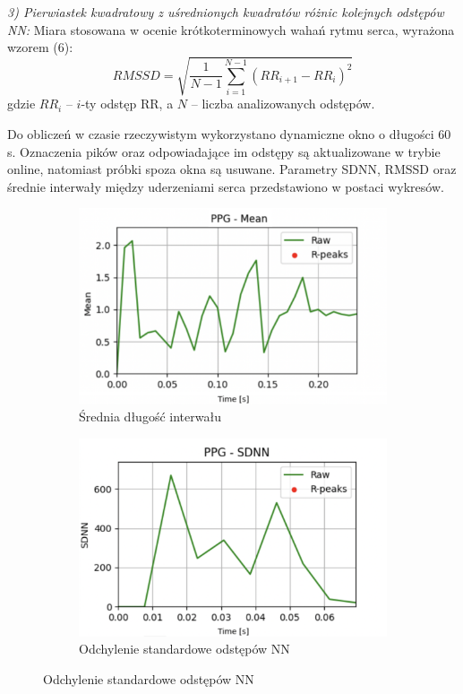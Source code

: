 \documentclass[journal]{IEEEtran}
\begin{document}
\noindent\textit{3) Pierwiastek kwadratowy z uśrednionych kwadratów różnic kolejnych odstępów NN:} 
Miara stosowana w ocenie krótkoterminowych wahań rytmu serca, wyrażona wzorem (6):
\begin{equation}
    RMSSD = \sqrt{\frac{1}{N-1} \sum_{i=1}^{N-1} (RR_{i+1} - RR_i)^2}
\end{equation}
gdzie $RR_i$ -- $i$-ty odstęp RR, a $N$ – liczba analizowanych odstępów.

Do obliczeń w czasie rzeczywistym wykorzystano dynamiczne okno o długości 60 s. Oznaczenia pików oraz odpowiadające im odstępy są aktualizowane w trybie online, natomiast próbki spoza okna są usuwane. Parametry SDNN, RMSSD oraz średnie interwały między uderzeniami serca przedstawiono w postaci wykresów.

\begin{figure}[h]
    \centering
    \begin{subfigure}{0.5\textwidth}
        \centering
        \includegraphics[width=\linewidth]{Mean.png}
        \caption{Średnia długość interwału}
    \end{subfigure}
    
   \vspace{0.5cm} 
    \begin{subfigure}{0.5\textwidth}
        \centering
        \includegraphics[width=\linewidth]{SDNN.png}
        \caption{Odchylenie standardowe odstępów NN}
    \end{subfigure}
    

\end{figure}
\end{document}
